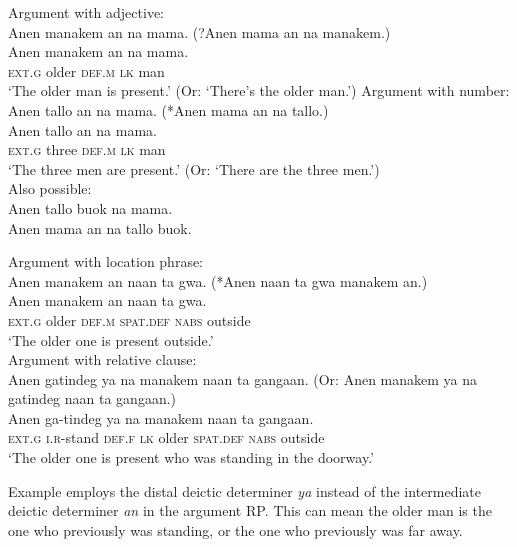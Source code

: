 \ea
\label{ex:definitegivenexistentialwithadjective}
Argument with adjective: \\
Anen  manakem  an  na  mama.  (?Anen mama an na manakem.) \\\smallskip
\gll  Anen  manakem  an  na  mama. \\
\textsc{ext.g}  older  \textsc{def.m}  \textsc{lk}  man \\
\glt ‘The older man is present.’ (Or: ‘There’s the older man.’) 
\z
\ea
\label{bkm:Ref442519677}
Argument with number: \\
Anen  tallo  an  na  mama. (*Anen mama an na tallo.) \\\smallskip
\gll  Anen  tallo  an  na  mama. \\
\textsc{ext.g}  three  \textsc{def.m  lk}  man \\
\glt ‘The three men are present.’ (Or: ‘There are the three men.’) \\\smallskip
Also possible: \\
Anen tallo buok na mama. \\
Anen mama an na tallo buok.
\z

\newpage
\ea
\label{ex:givendefiniteexistentialwithlocation}
Argument with location phrase: \\
Anen  manakem  an  naan  ta  gwa. (*Anen naan ta gwa manakem an.) \\\smallskip
\gll  Anen  manakem  an  naan  ta  gwa. \\
\textsc{ext.g}  older  \textsc{def.m} \textsc{spat.def}  \textsc{nabs}  outside \\
\glt ‘The older one is present outside.’ \\
\z
\ea
\label{bkm:Ref329939931}
\label{bkm:Ref442854660}
Argument with relative clause: \\
Anen  gatindeg  ya  na  manakem  naan  ta  gangaan. (Or: Anen manakem ya na gatindeg naan ta gangaan.) \\\smallskip
\gll  Anen  ga-tindeg  ya  na  manakem  naan  ta  gangaan. \\
\textsc{ext.g}  \textsc{i.r}-stand  \textsc{def.f}  \textsc{lk} older \textsc{spat.def}  \textsc{nabs}  outside \\
\glt ‘The older one is present who was standing in the doorway.’ \\
\z

Example  employs the distal deictic determiner \textit{ya} instead of the intermediate deictic determiner \textit{an} in the argument RP.  This can mean the older man is the one who previously was standing, or the one who previously was far away.


